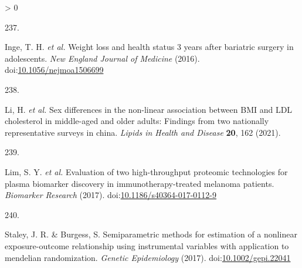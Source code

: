 \documentclass[11pt,twoside]{bristolthesis}
\newlength{\cslhangindent}
\newlength{\csllabelwidth}
\newenvironment{CSLReferences}[2] %
 {%
  \setlength{\parindent}{0pt}
  \ifodd #1 \everypar{\setlength{\hangindent}{\cslhangindent}}\ignorespaces\fi
  \ifnum #2 > 0
  \setlength{\parskip}{#2\baselineskip}
  \fi
 }%
 {}
\newcommand{\CSLLeftMargin}[1]{\parbox[t]{\csllabelwidth}{#1}}
\newcommand{\CSLRightInline}[1]{\parbox[t]{\linewidth - \csllabelwidth}{#1}\break}
\begin{document}
\begin{CSLReferences}{0}{0}
\leavevmode\hypertarget{ref-Inge2016}{}%
\CSLLeftMargin{237. }
\CSLRightInline{Inge, T. H. \emph{et al.} Weight loss and health status 3 years after bariatric surgery in adolescents. \emph{New England Journal of Medicine} (2016). doi:\href{https://doi.org/10.1056/nejmoa1506699}{10.1056/nejmoa1506699}}

\leavevmode\hypertarget{ref-Li2021}{}%
\CSLLeftMargin{238. }
\CSLRightInline{Li, H. \emph{et al.} Sex differences in the non-linear association between BMI and LDL cholesterol in middle-aged and older adults: Findings from two nationally representative surveys in china. \emph{Lipids in Health and Disease} \textbf{20}, 162 (2021).}

\leavevmode\hypertarget{ref-Lim2017}{}%
\CSLLeftMargin{239. }
\CSLRightInline{Lim, S. Y. \emph{et al.} Evaluation of two high-throughput proteomic technologies for plasma biomarker discovery in immunotherapy-treated melanoma patients. \emph{Biomarker Research} (2017). doi:\href{https://doi.org/10.1186/s40364-017-0112-9}{10.1186/s40364-017-0112-9}}

\leavevmode\hypertarget{ref-Staley2017}{}%
\CSLLeftMargin{240. }
\CSLRightInline{Staley, J. R. \& Burgess, S. Semiparametric methods for estimation of a nonlinear exposure-outcome relationship using instrumental variables with application to mendelian randomization. \emph{Genetic Epidemiology} (2017). doi:\href{https://doi.org/10.1002/gepi.22041}{10.1002/gepi.22041}}

\end{CSLReferences}
\end{document}
